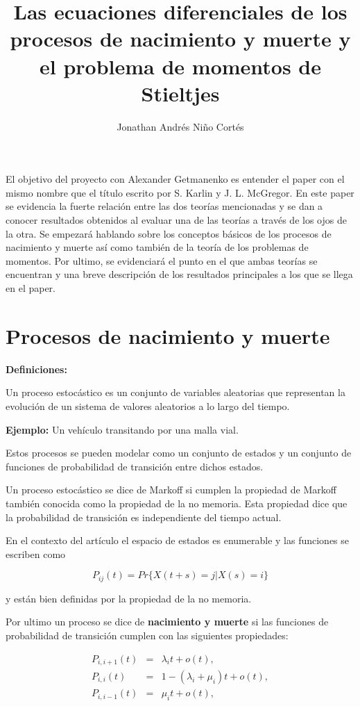 \documentclass[letter,twoside,12pt]{article}
\title{Las ecuaciones diferenciales de los procesos de nacimiento y muerte y el problema de momentos de Stieltjes}
\author{Jonathan Andrés Niño Cortés}
\numberwithin{equation}{section}
\begin{document}
\maketitle

El objetivo del proyecto con Alexander Getmanenko es entender el paper con el mismo nombre que el título escrito por S. Karlin y J. L. McGregor. En este paper se evidencia la fuerte relación entre las dos teorías mencionadas y se dan a conocer resultados obtenidos al evaluar una de las teorías a través de los ojos de la otra. Se empezará hablando sobre los conceptos básicos de los procesos de nacimiento y muerte así como también de la teoría de los problemas de momentos. Por ultimo, se evidenciará el punto en el que ambas teorías se encuentran y una breve descripción de los resultados principales a los que se llega en el paper.

\section{Procesos de nacimiento y muerte}

\textbf{Definiciones:}

Un proceso estocástico es un conjunto de variables aleatorias que representan la evolución de un sistema de valores aleatorios a lo largo del tiempo.

\textbf{Ejemplo:} Un vehículo transitando por una malla vial.

Estos procesos se pueden modelar como un conjunto de estados y un conjunto de funciones de probabilidad de transición entre dichos estados. 

Un proceso estocástico se dice de Markoff si cumplen la propiedad de Markoff también conocida como la propiedad de la no memoria. Esta propiedad dice que la probabilidad de transición es independiente del tiempo actual.

En el contexto del artículo el espacio de estados es enumerable y las funciones se escriben como

\begin{equation}
P_{ij}(t) = Pr \{ X(t+s) = j | X(s) = i \} \nonumber
\end{equation}

y están bien definidas por la propiedad de la no memoria.

Por ultimo un proceso se dice de \textbf{nacimiento y muerte} si las funciones de probabilidad de transición cumplen con las siguientes propiedades:

\begin{eqnarray*}
P_{i,i+1}(t) &=& \lambda_it + o(t),
\\P_{i,i}(t) &=& 1 - (\lambda_i + \mu_i)t+o(t),
\\P_{i,i-1}(t) &=& \mu_it + o(t),
\end{eqnarray*}
\end{document}
